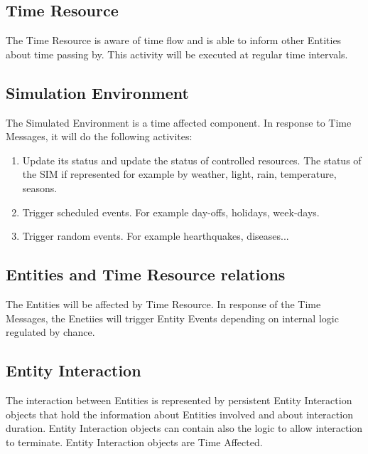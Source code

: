\subsection{Time Resource} 
The Time Resource is aware of time flow and is able to inform other Entities
about time passing by. This activity will be executed at regular time intervals.

\subsection{Simulation Environment} 
The Simulated Environment is a time affected component. In response to Time
Messages, it will do the following activites:

\begin{enumerate}
 \item Update its status and update the status of controlled resources. The
status of the SIM if represented for example by weather, light, rain,
temperature, seasons.
 \item Trigger scheduled events. For example day-offs, holidays, week-days.
 \item Trigger random events. For example hearthquakes, diseases...
\end{enumerate}


\subsection{Entities and Time Resource relations} 
The Entities will be affected by Time Resource. In response of the Time
Messages, the Enetiies will trigger Entity Events depending on internal logic
regulated by chance.

\subsection{Entity Interaction} 
The interaction between Entities is represented by persistent Entity
Interaction objects that hold the information about Entities involved and about
interaction duration. Entity Interaction objects can contain also the logic to 
allow interaction to terminate. Entity Interaction objects are Time Affected.

